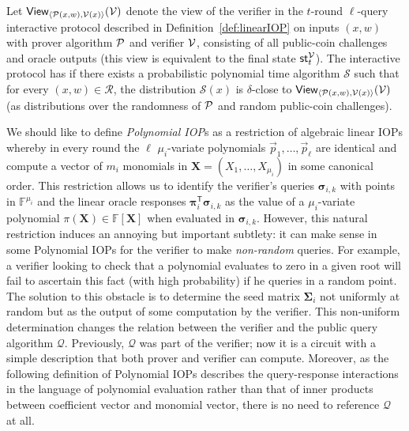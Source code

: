 \begin{definition}
Let $\textsf{View}_{\langle \mathcal{P}(x, w), \mathcal{V}(x) \rangle}(\mathcal{V})$ denote the view of the verifier in the $t$-round $\ell$-query interactive protocol described in Definition~\ref{def:linearIOP} on inputs $(x,w)$ with prover algorithm $\mathcal{P}$ and verifier $\mathcal{V}$, consisting of all public-coin challenges and oracle outputs (this view is equivalent to the final state $\textsf{st}^\mathcal{V}_t$). The interactive protocol has  if there exists a probabilistic polynomial time algorithm $\mathcal{S}$ such that for every $(x, w) \in \mathcal{R}$, the distribution $\mathcal{S}(x)$ is $\delta$-close to $\textsf{View}_{\langle \mathcal{P}(x, w), \mathcal{V}(x) \rangle}(\mathcal{V})$ (as distributions over the randomness of $\mathcal{P}$ and random public-coin challenges).
\end{definition}

We should like to define \emph{Polynomial IOP}s as a restriction of algebraic linear IOPs whereby in every round the $\ell$ $\mu_i$-variate polynomials $\vec{p}_1, \ldots, \vec{p}_\ell$ are identical and compute a vector of $m_i$ monomials in $\mathbf{X} = (X_1, \ldots, X_{\mu_i})$ in some canonical order. This restriction allows us to identify the verifier's queries $\boldsymbol{\sigma}_{i,k}$ with points in $\mathbb{F}^{\mu_i}$ and the linear oracle responses $\boldsymbol{\pi}_i^\mathsf{T} \boldsymbol{\sigma}_{i,k}$ as the value of a $\mu_i$-variate polynomial $\pi(\mathbf{X}) \in \mathbb{F}[\mathbf{X}]$ when evaluated in $\boldsymbol{\sigma}_{i,k}$. However, this natural restriction induces an annoying but important subtlety: it can make sense in some Polynomial IOPs for the verifier to make \emph{non-random} queries. For example, a verifier looking to check that a polynomial evaluates to zero in a given root will fail to ascertain this fact (with high probability) if he queries in a random point. The solution to this obstacle is to determine the seed matrix $\boldsymbol{\Sigma}_i$ not uniformly at random but as the output of some computation by the verifier. This non-uniform determination changes the relation between the verifier and the public query algorithm $\mathcal{Q}$. Previously, $\mathcal{Q}$ was part of the verifier; now it is a circuit with a simple description that both prover and verifier can compute. Moreover, as the following definition of Polynomial IOPs describes the query-response interactions in the language of polynomial evaluation rather than that of inner products between coefficient vector and monomial vector, there is no need to reference $\mathcal{Q}$ at all.

